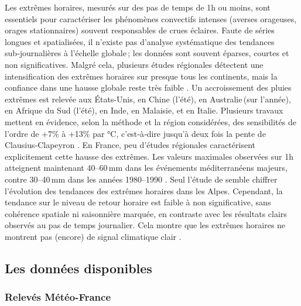 \documentclass[
  article,
  nofooter,
  noheadings]{jss}
\begin{document}
Les extrêmes horaires, mesurés sur des pas de temps de 1h ou moins, sont
essentiels pour caractériser les phénomènes convectifs intenses (averses
orageuses, orages stationnaires) souvent responsables de crues éclaires.
Faute de séries longues et spatialisées, il n'existe pas d'analyse
systématique des tendances sub‑journalières à l'échelle globale\,; les
données sont souvent éparses, courtes et non significatives. Malgré
cela, plusieurs études régionales détectent une intensification des
extrêmes horaires sur presque tous les continents, mais la confiance
dans une hausse globale reste très faible \citep{IPCC2021}. Un
accroissement des pluies extrêmes est relevée aux États-Unis, en Chine
(l'été), en Australie\,(sur l'année), en Afrique du Sud (l'été), en
Inde, en Malaisie, et en Italie. Plusieurs travaux mettent en évidence,
selon la méthode et la région considérées, des sensibilités de l'ordre
de +7\% à +13\% par °C, c'est‑à‑dire jusqu'à deux fois la pente de
Clausius‑Clapeyron \citep{molnar2015relation}. En France, peu d'études
régionales caractérisent explicitement cette hausse des extrêmes. Les
valeurs maximales observées sur 1h atteignent maintenant 40--60\,mm dans
les événements méditerranéens majeurs, contre 30--40\,mm dans les années
1980--1990 \citep{meteofrance2024_episodesMediterraneens}. Seul l'étude
de \citet{Berghald2025} semble chiffrer l'évolution des tendances des
extrêmes horaires dans les Alpes. Cependant, la tendance sur le niveau
de retour horaire est faible à non significative, sans cohérence
spatiale ni saisonnière marquée, en contraste avec les résultats clairs
observés au pas de temps journalier. Cela montre que les extrêmes
horaires ne montrent pas (encore) de signal climatique clair
\citep{Soubeyroux01022015}.

\subsection{Les données disponibles}\label{les-donnuxe9es-disponibles}

\subsubsection{Relevés
Météo-France}\label{relevuxe9s-muxe9tuxe9o-france}
\end{document}

